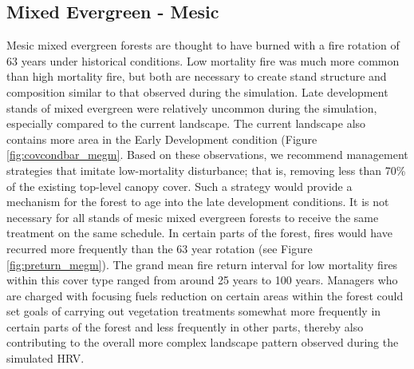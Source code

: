\subsection{Mixed Evergreen - Mesic}
Mesic mixed evergreen forests are thought to have burned with a fire rotation of 63 years under historical conditions. Low mortality fire was much more common than high mortality fire, but both are necessary to create stand structure and composition similar to that observed during the simulation. Late development stands of mixed evergreen were relatively uncommon during the simulation, especially compared to the current landscape. The current landscape also contains more area in the Early Development condition (Figure \ref{fig:covcondbar_megm}. Based on these observations, we recommend management strategies that imitate low-mortality disturbance; that is, removing less than 70\% of the existing top-level canopy cover. Such a strategy would provide a mechanism for the forest to age into the late development conditions. It is not necessary for all stands of mesic mixed evergreen forests to receive the same treatment on the same schedule. In certain parts of the forest, fires would have recurred more frequently than the 63 year rotation (see Figure \ref{fig:preturn_megm}). The grand mean fire return interval for low mortality fires within this cover type ranged from around 25 years to 100 years. Managers who are charged with focusing fuels reduction on certain areas within the forest could set goals of carrying out vegetation treatments somewhat more frequently in certain parts of the forest and less frequently in other parts, thereby also contributing to the overall more complex landscape pattern observed during the simulated HRV. 

